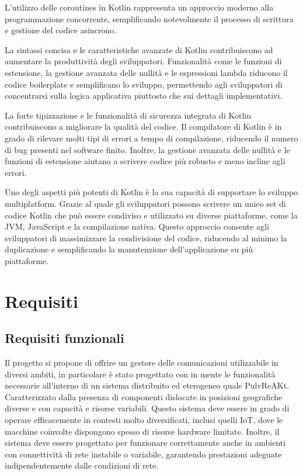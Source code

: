 \documentclass[12pt,a4paper,openright,twoside]{book}
\begin{document}
L'utilizzo delle coroutines in Kotlin rappresenta un approccio moderno alla programmazione concorrente, 
semplificando notevolmente il processo di scrittura e gestione del codice asincrono.

La sintassi concisa e le caratteristiche avanzate di Kotlin contribuiscono ad aumentare la produttività degli sviluppatori. 
Funzionalità come le funzioni di estensione, la gestione avanzata delle nullità e le espressioni lambda riducono il codice boilerplate e semplificano lo sviluppo, 
permettendo agli sviluppatori di concentrarsi sulla logica applicativa piuttosto che sui dettagli implementativi.

La forte tipizzazione e le funzionalità di sicurezza integrata di Kotlin contribuiscono a migliorare la qualità del codice. 
Il compilatore di Kotlin è in grado di rilevare molti tipi di errori a tempo di compilazione, riducendo il numero di bug presenti nel software finito. Inoltre, 
la gestione avanzata delle nullità e le funzioni di estensione aiutano a scrivere codice più robusto e meno incline agli errori.

Uno degli aspetti più potenti di Kotlin è la sua capacità di supportare lo sviluppo multiplatform. Grazie al quale gli sviluppatori possono scrivere 
un unico set di codice Kotlin che può essere condiviso e utilizzato su diverse piattaforme, come la \ac{JVM}, JavaScript e la compilazione nativa. 
Questo approccio consente agli sviluppatori di massimizzare la condivisione del codice, riducendo al minimo la duplicazione e semplificando la manutenzione dell'applicazione 
su più piattaforme.

\chapter{Requisiti}\label{chap:Requisiti}

\section{Requisiti funzionali}

Il progetto si propone di offrire un gestore delle comunicazioni utilizzabile in diversi ambiti, in particolare è stato progettato con in mente le funzionalità necessarie
all'interno di un sistema distribuito ed eterogeneo quale PulvReAKt. Caratterizzato dalla presenza di componenti dislocate in posizioni 
geografiche diverse e con capacità e risorse variabili. Questo sistema deve essere in grado di operare efficacemente in contesti molto diversificati, inclusi quelli 
\ac{IoT}, dove le macchine coinvolte dispongono spesso di risorse hardware limitate. Inoltre, il sistema deve essere progettato per funzionare correttamente anche in ambienti 
con connettività di rete instabile o variabile, garantendo prestazioni adeguate indipendentemente dalle condizioni di rete.
\end{document}
